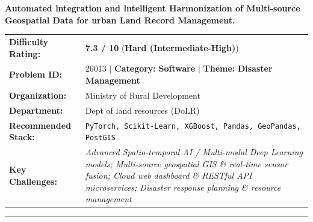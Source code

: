 \documentclass[10pt,a4paper]{article}
\begin{document}
\begin{tcolorbox}[pscard, title={"\textbf{SIH26013} \quad $\vert$ \quad Automated lntegration and lntelligent Harmonization of Multi-source Geospat...}]
\textbf{\large Automated lntegration and lntelligent Harmonization of Multi-source Geospatial Data for urban Land Record Management.}\\[0.25cm]

\begin{tabular}{@{}lp{12.5cm}@{}}
\textbf{Difficulty Rating:} & \textcolor{diffhard}{\textbf{\Large 7.3 / 10}} \quad (\textbf{Hard (Intermediate-High)}) \\
\textbf{Problem ID:} & 26013 \quad $\vert$ \quad \textbf{Category:} \textbf{Software} \quad $\vert$ \quad \textbf{Theme:} \textbf{Disaster Management} \\
\textbf{Organization:} & Ministry of Rural Development \\
\textbf{Department:} & Dept of land resources (DoLR) \\
\textbf{Recommended Stack:} & \texttt{PyTorch, Scikit-Learn, XGBoost, Pandas, GeoPandas, PostGIS} \\
\textbf{Key Challenges:} & \textit{\small Advanced Spatio-temporal AI / Multi-modal Deep Learning models; Multi-source geospatial GIS \& real-time sensor fusion; Cloud web dashboard \& RESTful API microservices; Disaster response planning \& resource management} \\
\end{tabular}

\vspace{0.2cm}
\hrule
\vspace{0.2cm}


\end{tcolorbox}
\end{document}
